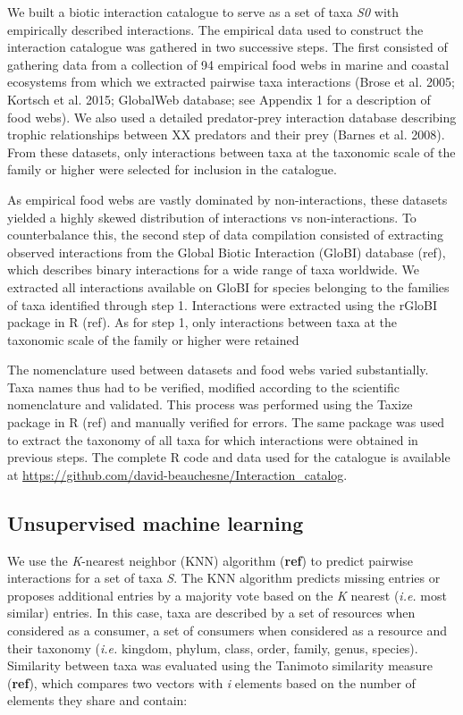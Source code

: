 \documentclass[letterpaper]{article}
\begin{document}
We built a biotic interaction catalogue to serve as a set of taxa \textit{S0} with empirically described interactions. The empirical data used to construct the interaction catalogue was gathered in two successive steps. The first consisted of gathering data from a collection of 94 empirical food webs in marine and coastal ecosystems from which we extracted pairwise taxa interactions (Brose et al. 2005; Kortsch et al. 2015; GlobalWeb database; see Appendix 1 for a description of food webs). We also used a detailed predator-prey interaction database describing trophic relationships between XX predators and their prey (Barnes et al. 2008). From these datasets, only interactions between taxa at the taxonomic scale of the family or higher were selected for inclusion in the catalogue.

As empirical food webs are vastly dominated by non-interactions, these datasets yielded a highly skewed distribution of interactions vs non-interactions. To counterbalance this, the second step of data compilation consisted of extracting observed interactions from the Global Biotic Interaction (GloBI) database (ref), which describes binary interactions for a wide range of taxa worldwide. We extracted all interactions available on GloBI for species belonging to the families of taxa identified through step 1. Interactions were extracted using the rGloBI package in R (ref). As for step 1, only interactions between taxa at the taxonomic scale of the family or higher were retained

The nomenclature used between datasets and food webs varied substantially. Taxa names thus had to be verified, modified according to the scientific nomenclature and validated. This process was performed using the Taxize package in R (ref) and manually verified for errors. The same package was used to extract the taxonomy of all taxa for which interactions were obtained in previous steps. The complete R code and data used for the catalogue is available at \href{https://github.com/david-beauchesne/Interaction_catalog}{https://github.com/david-beauchesne/Interaction\_catalog}.

  \subsection{Unsupervised machine learning}
We use the \textit{K}-nearest neighbor (KNN) algorithm (\textbf{ref}) to predict pairwise interactions for a set of taxa \textit{S}. The KNN algorithm predicts missing entries or proposes additional entries by a majority vote based on the \textit{K} nearest (\textit{i.e.} most similar) entries. In this case, taxa are described by a set of resources when considered as a consumer, a set of consumers when considered as a resource and their taxonomy (\textit{i.e.} kingdom, phylum, class, order, family, genus, species). Similarity between taxa was evaluated using the Tanimoto similarity measure (\textbf{ref}), which compares two vectors with \textit{i} elements based on the number of elements they share and contain:
\end{document}
